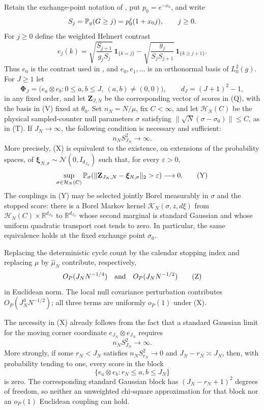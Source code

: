 \begin{proposition}
\label{prop:helmert-growing-layer-sharp-main}
Retain the exchange-point notation of
, put
$p_0=e^{-x_0}$, and write
\[
 S_j=\mathbb P_g(G\geq j)=p_0^j(1+x_0j),\qquad j\geq0.
\]
For $j\geq0$ define the weighted Helmert contrast
\[
 e_j(k)=
 \sqrt{\frac{S_{j+1}}{g_jS_j}}\,\mathbf1_{\{k=j\}}
 -\sqrt{\frac{g_j}{S_jS_{j+1}}}\,\mathbf1_{\{k\geq j+1\}}.
 \tag{V}
\]
Thus $e_0$ is the contrast used in
, and
$e_0,e_1,\ldots$ is an orthonormal basis of $L^2_0(g)$.  For $J\geq1$ let
\[
 \boldsymbol\Phi_J=
 \bigl(e_a\otimes e_b:0\leq a,b\leq J,\ (a,b)\neq(0,0)\bigr),
 \qquad d_J=(J+1)^2-1,
 \tag{W}
\]
in any fixed order, and let $\mathbf Z_{J,N}$ be the corresponding vector of
scores in \textup{(Q)}, with the basis in \textup{(V)} fixed at $\theta_0$.
Set $n_N=N/\mu$, fix $C<\infty$, and let $\mathcal H_N(C)$ be the physical
sampled-counter null parameters $\sigma$ satisfying
$\|\sqrt N(\sigma-\sigma_0)\|\leq C$, as in \textup{(T)}.  If
$J_N\to\infty$, the following condition is necessary and sufficient:
\[
 n_NS_{J_N}^2\longrightarrow\infty.
 \tag{X}
\]
More precisely, \textup{(X)} is equivalent to the existence, on extensions of
the probability spaces, of
$\boldsymbol\xi_{N,\sigma}\sim\mathcal N(0,I_{d_{J_N}})$ such that, for every
$\varepsilon>0$,
\[
 \sup_{\sigma\in\mathcal H_N(C)}
 \mathbb P_\sigma\!\left(
  \|\mathbf Z_{J_N,N}-\boldsymbol\xi_{N,\sigma}\|_2>\varepsilon
\right)\longrightarrow0.
 \tag{Y}
\]
The couplings in \textup{(Y)} may be selected jointly Borel measurably in
$\sigma$ and the stopped score: there is a Borel Markov kernel
$\mathcal K_N(\sigma,z,d\xi)$ from
$\mathcal H_N(C)\times\mathbb R^{d_{J_N}}$ to
$\mathbb R^{d_{J_N}}$ whose second marginal is standard Gaussian and whose
uniform quadratic transport cost tends to zero.
In particular, the same equivalence holds at the fixed exchange point
$\sigma_0$.

Replacing the deterministic cycle count by the
calendar stopping index and replacing $\mu$ by $\widehat\mu_N$ contribute,
respectively,
\[
 O_P(J_NN^{-1/4})\quad\hbox{and}\quad O_P(J_NN^{-1/2})
 \tag{Z}
\]
in Euclidean norm.  The local null covariance perturbation contributes
$O_P(J_N^3N^{-1/2})$; all three terms are uniformly $o_P(1)$ under
\textup{(X)}.

The necessity in \textup{(X)} already follows from the fact that a standard
Gaussian limit for the moving corner coordinate
$e_{J_N}\otimes e_{J_N}$ requires
\[
 n_NS_{J_N}^2\longrightarrow\infty.
 \tag{AA}
\]
More strongly, if some $r_N<J_N$ satisfies
$n_NS_{r_N}^2\to0$ and $J_N-r_N\asymp J_N$, then, with probability tending
to one, every score in the block
\[
 \{e_a\otimes e_b:r_N\leq a,b\leq J_N\}
 \tag{AB}
\]
is zero.  The corresponding standard Gaussian block has
$(J_N-r_N+1)^2$ degrees of freedom, so neither an unweighted chi-square
approximation for that block nor an $o_P(1)$ Euclidean coupling can hold.


\end{proposition}
